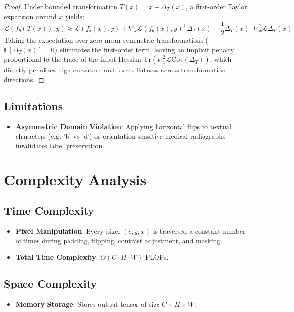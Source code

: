\documentclass[11pt,a4paper]{article}
\theoremstyle{definition}
\begin{document}
\begin{proof}
Under bounded transformation $T(x) = x + \Delta_T(x)$, a first-order Taylor expansion around $x$ yields:
\begin{equation}
\mathcal{L}(f_\theta(T(x)), y) \approx \mathcal{L}(f_\theta(x), y) + \nabla_x \mathcal{L}(f_\theta(x), y)^\top \Delta_T(x) + \frac{1}{2} \Delta_T(x)^\top \nabla_x^2 \mathcal{L} \Delta_T(x)
\end{equation}
Taking the expectation over zero-mean symmetric transformations ($\mathbb{E}[\Delta_T(x)] = 0$) eliminates the first-order term, leaving an implicit penalty proportional to the trace of the input Hessian $\text{Tr}(\nabla_x^2 \mathcal{L} \text{Cov}(\Delta_T))$, which directly penalizes high curvature and forces flatness across transformation directions.
\end{proof}

\subsection{Limitations}
\begin{itemize}
    \item \textbf{Asymmetric Domain Violation}: Applying horizontal flips to textual characters (e.g. 'b' vs 'd') or orientation-sensitive medical radiographs invalidates label preservation.
\end{itemize}

\section{Complexity Analysis}

\subsection{Time Complexity}
\begin{itemize}
    \item \textbf{Pixel Manipulation}: Every pixel $(c, y, x)$ is traversed a constant number of times during padding, flipping, contrast adjustment, and masking.
    \item \textbf{Total Time Complexity}: $\Theta(C \cdot H \cdot W)$ FLOPs.
\end{itemize}

\subsection{Space Complexity}
\begin{itemize}
    \item \textbf{Memory Storage}: Stores output tensor of size $C \times H \times W$.
\end{itemize}
\end{document}
